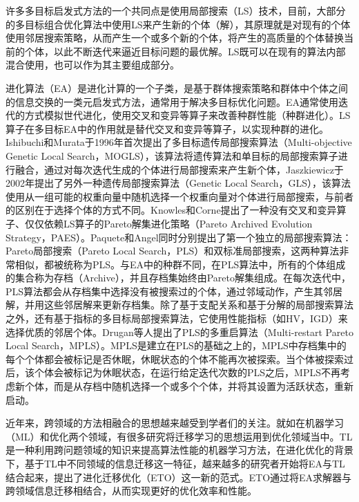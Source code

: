 \par
许多多目标启发式方法的一个共同点是使用局部搜索（LS）技术，目前，大部分的多目标组合优化算法中使用LS来产生新的个体（解），其原理就是对现有的个体使用邻居搜索策略，从而产生一个或多个新的个体，将产生的高质量的个体替换当前的个体，以此不断迭代来逼近目标问题的最优解。LS既可以在现有的算法内部混合使用，也可以作为其主要组成部分。
\par
进化算法（EA）是进化计算的一个子类，是基于群体搜索策略和群体中个体之间的信息交换的一类元启发式方法，通常用于解决多目标优化问题。EA通常使用迭代的方式模拟世代进化，使用交叉和变异等算子来改善种群性能（种群进化）。LS算子在多目标EA中的作用就是替代交叉和变异等算子，以实现种群的进化。Ishibuchi和Murata于1996年首次提出了多目标遗传局部搜索算法（Multi-objective Genetic Local Search，MOGLS）\cite{ishibuchi1996multi}，该算法将遗传算法和单目标的局部搜索算子进行融合，通过对每次迭代生成的个体进行局部搜索来产生新个体，Jaszkiewicz于2002年提出了另外一种遗传局部搜索算法（Genetic Local Search，GLS）\cite{jaszkiewicz2002genetic}，该算法使用从一组可能的权重向量中随机选择一个权重向量对个体进行局部搜索，与前者的区别在于选择个体的方式不同。Knowles和Corne提出了一种没有交叉和变异算子、仅仅依赖LS算子的Pareto解集进化策略（Pareto Archived Evolution Strategy，PAES）\cite{knowles1999pareto,knowles2000approximating}。Paquete\cite{paquete2004pareto}和Angel\cite{angel2004approximating}同时分别提出了第一个独立的局部搜索算法：Pareto局部搜索（Pareto Local Search，PLS）和双标准局部搜索，这两种算法非常相似，都被统称为PLS。与EA中的种群不同，在PLS算法中，所有的个体组成的集合称为存档（Archive），并且存档集始终由Pareto解集组成。在每次迭代中，PLS算法都会从存档集中选择没有被搜索过的个体，通过邻域动作，产生其邻居解，并用这些邻居解来更新存档集。除了基于支配关系和基于分解的局部搜索算法之外，还有基于指标的多目标局部搜索算法\cite{basseur2007indicator}，它使用性能指标（如HV，IGD）来选择优质的邻居个体。Drugan等人提出了PLS的多重启算法（Multi-restart Pareto Local Search，MPLS）\cite{drugan2012stochastic}。MPLS是建立在PLS的基础之上的，MPLS中存档集中的每个个体都会被标记是否休眠，休眠状态的个体不能再次被探索。当个体被探索过后，该个体会被标记为休眠状态，在运行给定迭代次数的PLS之后，MPLS不再考虑新个体，而是从存档中随机选择一个或多个个体，并将其设置为活跃状态，重新启动。
\par
近年来，跨领域的方法相融合的思想越来越受到学者们的关注。就如在机器学习（ML）和优化两个领域，有很多研究将迁移学习的思想运用到优化领域当中。TL是一种利用跨问题领域的知识来提高算法性能的机器学习方法，在进化优化的背景下，基于TL中不同领域的信息迁移这一特征，越来越多的研究者开始将EA与TL结合起来，提出了进化迁移优化（ETO）这一新的范式。ETO通过将EA求解器与跨领域信息迁移相结合，从而实现更好的优化效率和性能。
